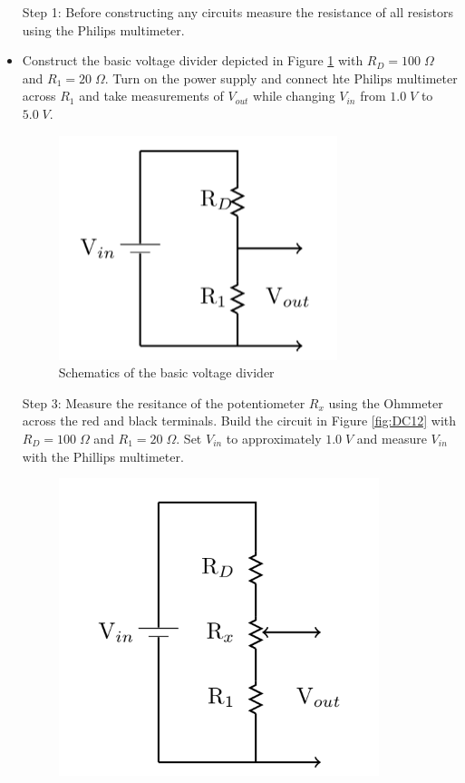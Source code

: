 \documentclass[12pt, a4paper, oneside, openright, titlepage]{book}
\begin{document}
\begin{itemize}[leftmargin = 50pt]
    \item[Step 1:] Before constructing any circuits measure the resistance of all resistors using the Philips multimeter.
    \item Construct the basic voltage divider depicted in Figure \ref{fig:DC11} with $R_D = 100\;\Omega$ and $R_1 = 20\;\Omega$. Turn on the power supply and connect hte Philips multimeter across $R_1$ and take measurements of $V_{out}$ while changing $V_{in}$ from $1.0\;V$ to $5.0\;V$. 

        \begin{figure}[H]
            \centering
            \includegraphics[scale = 0.8]{Images/DC11.PNG}
            \caption{Schematics of the basic voltage divider}
            \label{fig:DC11}
        \end{figure}
    \item[Step 3:] Measure the resitance of the potentiometer $R_x$ using the Ohmmeter across the red and black terminals. Build the circuit in Figure \ref{fig:DC12} with $R_D = 100\;\Omega$ and $R_1 = 20\;\Omega$. Set $V_{in}$ to approximately $1.0\;V$ and measure $V_{in}$ with the Phillips multimeter.
        \begin{figure}[H]
    \centering
    \includegraphics[scale = 0.8]{Images/DC12.PNG}

\end{figure}
\end{itemize}
\end{document}
